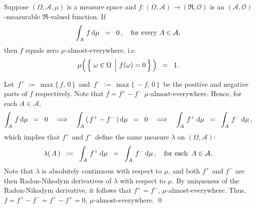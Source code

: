 \begin{corollary}
\label{Corollary:AlmostEverywhereZero}
\mbox{}\vskip 0.2cm
\noindent
Suppose $(\Omega,\mathcal{A},\mu)$ is a measure space and
$f : (\Omega,\mathcal{A}) \longrightarrow (\Re,\mathcal{O})$
is an $(\mathcal{A},\mathcal{O})$-measurable $\Re$-valued function.
If
\begin{equation*}
\int_{A}\,f\,\textnormal{d}\mu \;\;=\;\; 0\,,
\quad
\textnormal{for every $A \in \mathcal{A}$},
\end{equation*}
then $f$ equals zero $\mu$-almost-everywhere, i.e.
\begin{equation*}
\mu\!\left(\,\left\{\,\left.\omega\overset{{\color{white}.}}{\in}\Omega\;\,\right\vert\,f(\omega)=0\,\right\}\,\right)
\;\; = \;\; 1.
\end{equation*}
\end{corollary}
\proof
Let \,$f^{+} \,:=\, \max\{\,f,\,0\,\}$\, and \,$f^{-} \,:=\, \max\{\,-f,\,0\,\}$\, be the positive and negative parts of $f$ respectively.
Note that $f = f^{+} - f^{-}$ $\mu$-almost-everywhere.
Hence, for each $A \in \mathcal{A}$,
\begin{equation*}
\int_{A}\,f\,\textnormal{d}\mu \;\;=\;\; 0
\quad\Longrightarrow\quad
\int_{A}\,(\,f^{+}-f^{-}\,)\,\textnormal{d}\mu \;\;=\;\; 0
\quad\Longrightarrow\quad
\int_{A}\,f^{+}\,\textnormal{d}\mu \;\;=\;\; \int_{A}\,f^{-}\,\textnormal{d}\mu\,,
\end{equation*}
which implies that $f^{+}$ and $f^{-}$ define the same measure $\lambda$ on $(\Omega,\mathcal{A})$:
\begin{equation*}
\lambda(\,A\,)
	\;\; := \;\; \int_{A}\,f^{+}\,\textnormal{d}\mu \;\; = \;\; \int_{A}\,f^{-}\,\textnormal{d}\mu\,,
\quad
\textnormal{for each \,$A \in \mathcal{A}$}.
\end{equation*}
Note that $\lambda$ is absolutely continuous with respect to $\mu$, and
both $f^{+}$ and $f^{-}$ are then Radon-Nikodym derivatives of $\lambda$ with respect to $\mu$.
By uniqueness of the Radon-Nikodym derivative, it follows that $f^{+} = f^{-}$, $\mu$-almost-everywhere.
Thus, $f = f^{+} - f^{-} = f^{+} - f^{+} = 0$, $\mu$-almost-everywhere.
\qed

